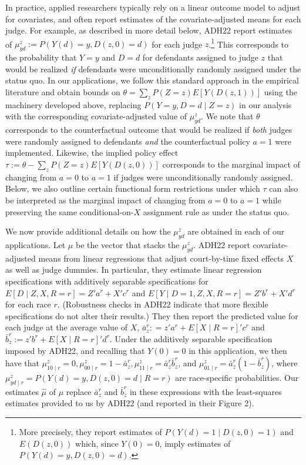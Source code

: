 \documentclass[12pt]{article}%
\theoremstyle{definition}
\newcommand\1{\operatorname{I}\indicatorfence}
\begin{document}
\begin{appendices}
In practice, applied researchers typically rely on a linear outcome model to adjust for covariates, and often report estimates of the covariate-adjusted means for each judge. For example, as described in more detail below, ADH22 report estimates of $\mu_{yd}^z  :=P(Y(d)=y,D(z,0)=d)$ for each judge $z$.\footnote{More precisely, they report estimates of $P(Y(d) =1 \mid D(z,0)=1)$ and $E(D(z,0))$ which, since $Y(0)=0$, imply estimates of $P(Y(d)=y,D(z,0)=d)$.} This corresponds to the probability that $Y=y$ and $D=d$ for defendants assigned to judge $z$ that would be realized \emph{if} defendants were unconditionally randomly assigned under the status quo. In our applications, we follow this standard approach in the empirical literature and obtain bounds on $\theta = \sum_z P(Z=z) E[Y(D(z,1))]$ using the machinery developed above, replacing $P(Y=y,D=d \mid Z=z)$ in our analysis with the corresponding covariate-adjusted value of $\mu^z_{yd}$. We note that $\theta$ corresponds to the counterfactual outcome that would be realized if \emph{both} judges were randomly assigned to defendants \emph{and} the counterfactual policy $a=1$ were implemented. Likewise, the implied policy effect $\tau := \theta - \sum_z P(Z=z) E[Y(D(z,0))]$ corresponds to the marginal impact of changing from $a=0$ to $a=1$ if judges were unconditionally randomly assigned. Below, we also outline certain functional form restrictions under which $\tau$ can also be interpreted as the marginal impact of changing from $a=0$ to $a=1$ while preserving the same conditional-on-$X$ assignment rule as under the status quo.


We now provide additional details on how the $\mu_{yd}^z$ are obtained in each of our applications. Let $\mu$ be the vector that stacks the $\mu_{yd}^z$. ADH22 report covariate-adjusted means from linear regressions that adjust court-by-time fixed effects $X$ as well as judge dummies. In particular, they estimate linear regression specifications with additively separable specifications for $E[D\mid Z, X, R=r]=Z'a^{r}+X'c^{r}$ and
$E[Y\mid D=1,Z, X, R=r]=Z'b^{r}+X'd^{r}$ for each race $r$. (Robustness checks in
ADH22 indicate that more flexible specifications do not alter their results.) They then report the predicted value for each judge at the average value of $X$, $\bar{a}_z^r: = z' a^r + E[X \mid R=r]' c^r$ and $\bar{b}_z^r:=z' b^r + E[X \mid R=r]'d^r$. Under the additively separable specification imposed by ADH22, and recalling that $Y(0)=0$ in this application, we then have that $\mu_{10 \mid r}^z = 0, \mu_{00\mid r}^z = 1 - \bar{a}_z^r, \mu_{11 \mid r}^z = \bar{a}_z^r \bar{b}_z^r$, and $\mu_{01\mid r}^z = \bar{a}_z^r (1-\bar{b}_z^r)$, where $\mu_{yd\mid r}^z=P(Y(d)=y, D(z,0)=d\mid R=r)$ are race-specific probabilities. Our estimates $\hat{\mu}$ of $\mu$ replace $\bar{a}_z^r$ and $\bar{b}_z^r$ in these expressions with the least-squares estimates provided to us by ADH22 (and reported in their Figure 2).


\end{appendices}
\end{document}
